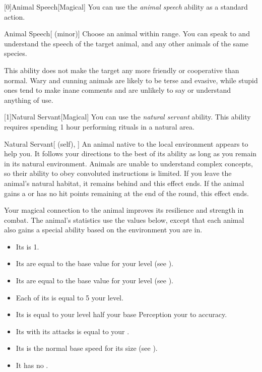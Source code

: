         [0]{Animal Speech}[Magical] You can use the \textit{animal speech} ability as a standard action.
        \begin{attuneability}{Animal Speech}[ (minor)]
            Choose an animal within \rnglong range.
            You can speak to and understand the speech of the target animal, and any other animals of the same species.

            This ability does not make the target any more friendly or cooperative than normal.
            Wary and cunning animals are likely to be terse and evasive, while stupid ones tend to make inane comments and are unlikely to say or understand anything of use.
        \end{attuneability}

        [1]{Natural Servant}[Magical]
        You can use the \textit{natural servant} ability.
        This ability requires spending 1 hour performing rituals in a natural area.
        \begin{attuneability}{Natural Servant}[ (self), ]
            An animal native to the local environment appears to help you.
            It follows your directions to the best of its ability as long as you remain in its natural environment.
            Animals are unable to understand complex concepts, so their ability to obey convoluted instructions is limited.
            If you leave the animal's natural habitat, it remains behind and this effect ends.
            If the animal gains a  or has no hit points remaining at the end of the round, this effect ends.

            Your magical connection to the animal improves its resilience and strength in combat.
            The animal's statistics use the values below, except that each animal also gains a special ability based on the environment you are in.
            \begin{itemize}
                \item Its  is 1.
                \item Its  are equal to the base value for your level (see ).
                \item Its  are equal to the base value for your level (see ).
                \item Each of its  is equal to 5 \add your level.
                \item Its  is equal to your level \add half your base Perception \add your  to accuracy.
                \item Its  with its attacks is equal to your  .
                \item Its  is the normal base speed for its size (see ).
                \item It has no .
            \end{itemize}
        \end{attuneability}

